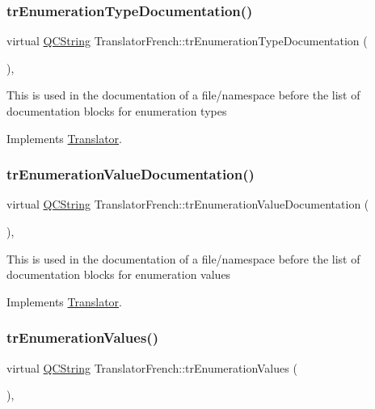 \subsubsection{\texorpdfstring{trEnumerationTypeDocumentation()}{trEnumerationTypeDocumentation()}}
{\footnotesize\ttfamily virtual \mbox{\hyperlink{class_q_c_string}{Q\+C\+String}} Translator\+French\+::tr\+Enumeration\+Type\+Documentation (\begin{DoxyParamCaption}{ }\end{DoxyParamCaption})\hspace{0.3cm}{\ttfamily [inline]}, {\ttfamily [virtual]}}

This is used in the documentation of a file/namespace before the list of documentation blocks for enumeration types 

Implements \mbox{\hyperlink{class_translator}{Translator}}.

\mbox{\label{class_translator_french_ac64b23f119d9179fd0ea90894bf08c6d}} 
\subsubsection{\texorpdfstring{trEnumerationValueDocumentation()}{trEnumerationValueDocumentation()}}
{\footnotesize\ttfamily virtual \mbox{\hyperlink{class_q_c_string}{Q\+C\+String}} Translator\+French\+::tr\+Enumeration\+Value\+Documentation (\begin{DoxyParamCaption}{ }\end{DoxyParamCaption})\hspace{0.3cm}{\ttfamily [inline]}, {\ttfamily [virtual]}}

This is used in the documentation of a file/namespace before the list of documentation blocks for enumeration values 

Implements \mbox{\hyperlink{class_translator}{Translator}}.

\mbox{\label{class_translator_french_a5baf129f52a603e36d634ea46dfe29a0}} 
\subsubsection{\texorpdfstring{trEnumerationValues()}{trEnumerationValues()}}
{\footnotesize\ttfamily virtual \mbox{\hyperlink{class_q_c_string}{Q\+C\+String}} Translator\+French\+::tr\+Enumeration\+Values (\begin{DoxyParamCaption}{ }\end{DoxyParamCaption})\hspace{0.3cm}{\ttfamily [inline]}, {\ttfamily [virtual]}}

